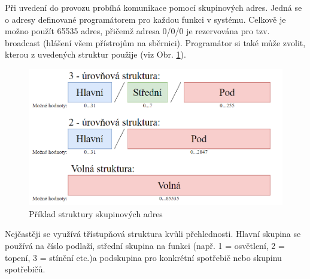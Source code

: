 Při uvedení do provozu probíhá komunikace pomocí skupinových adres. Jedná se o adresy definované programátorem pro každou funkci v systému. Celkově je možno použít 65535 adres, přičemž adresa 0/0/0 je rezervována pro tzv. broadcast (hlášení všem přístrojům na sběrnici). Programátor si také může zvolit, kterou z uvedených struktur použije (viz Obr. \ref{fig:Příklad struktury skupinových adres}). 
\begin{figure}[!h]
  \begin{center}
    \includegraphics[scale=0.6]{obrazky/Skupinove adresovani.png}
  \end{center}
  \caption[Příklad struktury skupinových adres \cite{Celkovy prehled}]{Příklad struktury skupinových adres \cite{Celkovy prehled}}
  \label{fig:Příklad struktury skupinových adres}  
\end{figure}
Nejčastěji se využívá třístupňová struktura kvůli přehlednosti. Hlavní skupina se používá na číslo podlaží,  střední skupina na funkci (např. 1 = osvětlení, 2 = topení, 3 = stínění etc.)a podskupina pro konkrétní spotřebič nebo skupinu spotřebičů. \cite{Celkovy prehled}
\\
\\
\\

